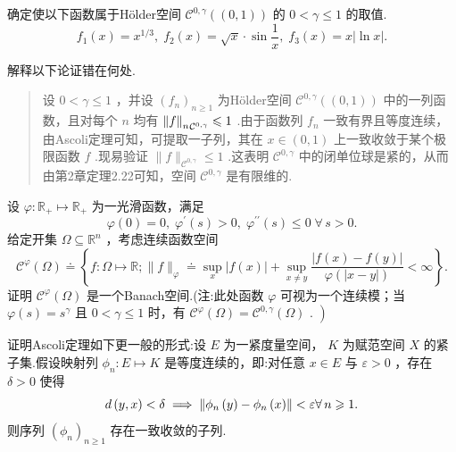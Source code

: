 \begin{rbhw}
确定使以下函数属于Hölder空间 ${\mathcal{C}}^{0,\gamma }\left( {( 0,1) }\right)$ 的 $0 < \gamma  \leq  1$ 的取值.
\[
{f}_{1}\left( x\right)  = {x}^{1/3},\;{f}_{2}\left( x\right)  = \sqrt{x} \cdot  \sin \frac{1}{x},\;{f}_{3}\left( x\right)  = x\left| {\ln x}\right| .
\]
\end{rbhw}

\begin{rbhw}
解释以下论证错在何处.
\begin{quote}
设 $0 < \gamma  \leq  1$ ，并设 ${\left( {f}_{n}\right) }_{n \geq  1}$ 为Hölder空间 ${\mathcal{C}}^{0,\gamma }\left( \left(  {0,1}\right)  \right)$ 中的一列函数，且对每个 $n$ 均有 ${\norm{f}_{n}}_{{\mathcal{C}}^{0,\gamma }} \leqslant  1$ .由于函数列 ${f}_{n}$ 一致有界且等度连续，由Ascoli定理可知，可提取一子列，其在 $x \in  \left(  {0,1}\right)$ 上一致收敛于某个极限函数 $f$ .现易验证 $\| f{\| }_{{\mathcal{C}}^{0,\gamma }} \leq  1$ .这表明 ${\mathcal{C}}^{0,\gamma }$ 中的闭单位球是紧的，从而由第2章定理2.22可知，空间 ${\mathcal{C}}^{0,\gamma }$ 是有限维的.
\end{quote}
\end{rbhw}

\begin{rbhw}
设 $\varphi  : {\mathbb{R}}_{ + } \mapsto  {\mathbb{R}}_{ + }$ 为一光滑函数，满足
\[
\varphi \left( 0\right)  = 0,\;{\varphi }^{\prime }\left( s\right)  > 0,\;{\varphi }^{\prime \prime }\left( s\right)  \leq  0\;\forall\,s > 0.
\]
给定开集 $\Omega  \subseteq  {\mathbb{R}}^{n}$ ，考虑连续函数空间
\[
{\mathcal{C}}^{\varphi }\left( \Omega \right)  \doteq  \left\{  {f : \Omega  \mapsto  \mathbb{R};\| f{\| }_{\varphi } \doteq  \mathop{\sup }\limits_{x}\left| {f\left( x\right) }\right|  + \mathop{\sup }\limits_{{x \neq  y}}\frac{\left| f\left( x\right)  - f\left( y\right) \right| }{\varphi \left( \left| {x - y}\right| \right) } < \infty }\right\}  .
\]
证明 ${\mathcal{C}}^{\varphi }\left( \Omega \right)$ 是一个Banach空间.(注:此处函数 $\varphi$ 可视为一个连续模；当 $\varphi \left( s\right)  = {s}^{\gamma }$ 且 $0 < \gamma  \leq  1$ 时，有 $\left. {{\mathcal{C}}^{\varphi }\left( \Omega \right)  = {\mathcal{C}}^{0,\gamma }\left( \Omega \right) \text{ . }}\right)$
\end{rbhw}

\begin{rbhw}
证明Ascoli定理如下更一般的形式:设 $E$ 为一紧度量空间， $K$ 为赋范空间 $X$ 的紧子集.假设映射列 ${\phi }_{n} : E \mapsto  K$ 是等度连续的，即:对任意 $x \in  E$ 与 $\varepsilon  > 0$ ，存在 $\delta  > 0$ 使得
\[
d\left( {y,x}\right)  < \delta \implies\norm{{\phi }_{n}\left( y\right)  - {\phi }_{n}\left( x\right) } < \varepsilon \forall\,n \geqslant  1.
\]
则序列 ${\left( {\phi }_{n}\right) }_{n \geq  1}$ 存在一致收敛的子列.
\end{rbhw}